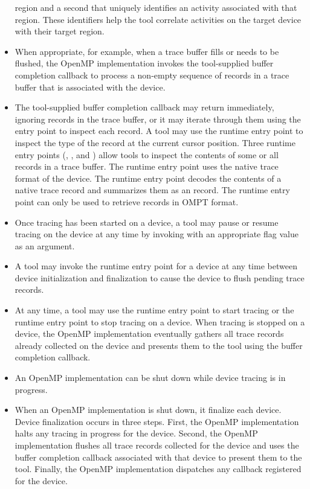 \begin{itemize}
      region and a second that uniquely identifies an activity associated 
      with that region. These identifiers help the tool correlate activities 
      on the target device with their target region.
\item When appropriate, for example, when a trace buffer fills or needs to be
      flushed, the OpenMP implementation invokes the tool-supplied buffer
      completion callback to process a non-empty sequence of records in a 
      trace buffer that is associated with the device.
\item The tool-supplied buffer completion callback may return immediately, 
      ignoring records in the trace buffer, or it may iterate through them 
      using the  entry point to inspect 
      each record. A tool may use the  runtime 
      entry point to inspect the type of the record at the current cursor 
      position. Three runtime entry points (, 
      , and ) 
      allow tools to inspect the contents of some or all records in a trace 
      buffer. The  runtime entry point uses 
      the native trace format of the device. The  
      runtime entry point decodes the contents of a native trace record and 
      summarizes them as an  record. The 
       runtime entry point can only be used to
      retrieve records in OMPT format.
\item Once tracing has been started on a device, a tool may pause or resume
      tracing on the device at any time by invoking  
      with an appropriate flag value as an argument.
\item A tool may invoke  the  runtime entry point for a
      device at any time between device initialization and finalization to
      cause the device to flush pending trace records.
\item At any time, a tool may use the  runtime entry
      point to start tracing or the  runtime entry point
      to stop tracing on a device. When tracing is stopped on a device, the
      OpenMP implementation eventually gathers all trace records already
      collected on the device and presents them to the tool using the buffer
      completion callback.
\item An OpenMP implementation can be shut down while device tracing is in 
      progress.
\item When an OpenMP implementation is shut down, it finalize each device. 
      Device finalization occurs in three steps. First, the OpenMP
      implementation halts any tracing in progress for the device. Second,
      the OpenMP implementation flushes all trace records collected for the
      device and uses the buffer completion callback associated with that
      device to present them to the tool. Finally, the OpenMP implementation
      dispatches any  callback 
      registered for the device.
\end{itemize}

